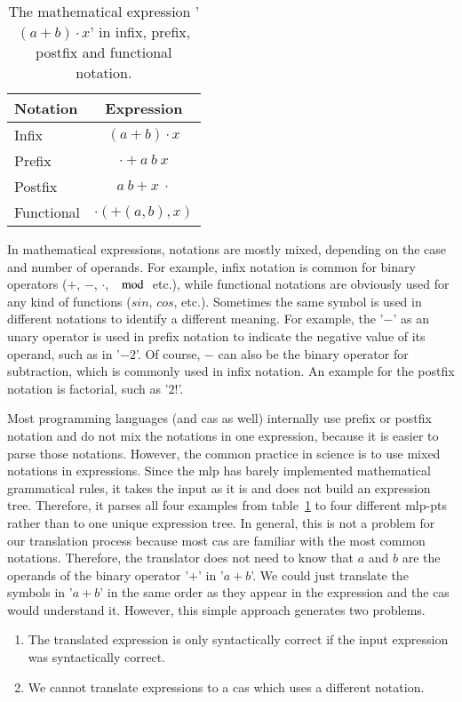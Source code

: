 \begin{table}[!ht]
\centering
\begin{tabular}{lc}
	\hline
	Notation & Expression \\
	\hline
	Infix & $(a+b) \cdot x$\\
	Prefix & $\cdot + a\ b\ x$\\
	Postfix & $a\ b + x\ \cdot$\\
	Functional & $\cdot(+(a, b), x)$\\
	\hline
\end{tabular}
\caption{The mathematical expression '$(a+b) \cdot x$' in infix, prefix, postfix and functional notation.}
\label{tab:notations}
\end{table}

In mathematical expressions, notations are mostly mixed, depending on the case and number of operands. For example, infix notation is common for binary operators ($+$, $-$, $\cdot$, $\mod$ etc.), while functional notations are obviously used for any kind of functions ($sin$, $cos$, etc.). Sometimes the same symbol is used in different notations to identify a different meaning. For example, the '$-$' as an unary operator is used in prefix notation to indicate the negative value of its operand, such as in '$-2$'. Of course, $-$ can also be the binary operator for subtraction, which is commonly used in infix notation. An example for the postfix notation is factorial, such as '$2!$'.

Most programming languages (and \gls{cas} as well) internally use prefix or postfix notation and do not mix the notations in one expression, because it is easier to parse those notations. However, the common practice in science is to use mixed notations in expressions. Since the \gls{mlp} has barely implemented mathematical grammatical rules, it takes the input as it is and does not build an expression tree. Therefore, it parses all four examples from table~\ref{tab:notations} to four different \gls{mlp-pt}s rather than to one unique expression tree. In general, this is not a problem for our translation process because most \gls{cas} are familiar with the most common notations. Therefore, the translator does not need to know that $a$ and $b$ are the operands of the binary operator '$+$' in '$a+b$'. We could just translate the symbols in '$a+b$' in the same order as they appear in the expression and the \gls{cas} would understand it. However, this simple approach generates two problems.
\begin{enumerate}%
\item \label{prob:1} The translated expression is only syntactically correct if the input expression was syntactically correct.
\item \label{prob:2} We cannot translate expressions to a \gls{cas} which uses a different notation.
\end{enumerate}

